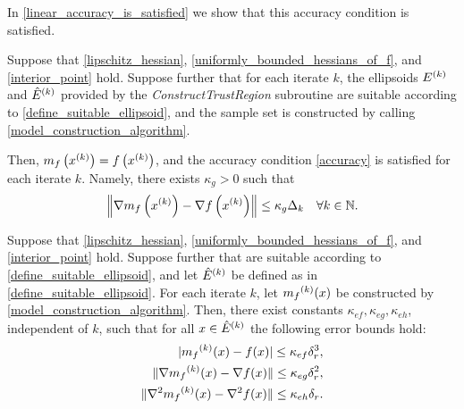 \documentclass{article}
\begin{document}
In \cref{linear_accuracy_is_satisfied} we show that this accuracy condition is satisfied.


\begin{theorem}
\label{linear_accuracy_is_satisfied}

Suppose that \cref{lipschitz_hessian}, \cref{uniformly_bounded_hessians_of_f}, and \cref{interior_point} hold.
Suppose further that for each iterate $k$, the ellipsoids ${E^{(k)}}$ and ${{\hat E}^{(k)}}$ provided by the \emph{ConstructTrustRegion} subroutine 
are suitable according to \cref{define_suitable_ellipsoid},
and the sample set is constructed by calling \cref{model_construction_algorithm}.


Then, $m_f\left(x^{(k)}\right) = f\left(x^{(k)}\right)$, and
the accuracy condition \cref{accuracy} is satisfied for each iterate $k$.
Namely, there exists $\kappa_{g} > 0$ such that 
\begin{align*}
\left\|\nabla m_f\left(x^{(k)}\right) - \nabla f\left(x^{(k)}\right)\right\| \le \kappa_g \Delta_k \quad \forall k \in \mathbb N.
\end{align*}
\end{theorem}


\begin{theorem}
\label{linear_accuracy_is_satisfied}

Suppose that \cref{lipschitz_hessian}, \cref{uniformly_bounded_hessians_of_f}, and \cref{interior_point} hold.  
Suppose further that 
are suitable according to \cref{define_suitable_ellipsoid}, and let ${{\hat E}^{(k)}}$ be defined as in \cref{define_suitable_ellipsoid}.    For each iterate $k$, let ${{m}_f}^{(k)}(x)$ be constructed by \cref{model_construction_algorithm}.    
Then,  there exist constants $\kappa_{ef}, \kappa_{eg}, \kappa_{eh}$, independent of $k$,  such that for all $x \in {{\hat E}^{(k)}}$ the following error bounds hold:
 \begin{align*}
|{{m}_f}^{(k)}(x) - f(x)| \le \kappa_{ef} \delta_r^3, \\
\|\nabla {{m}_f}^{(k)}(x) - \nabla  f(x)\| \le \kappa_{eg}\delta_r^2,  \\
\|\nabla^2 {{m}_f}^{(k)}(x) - \nabla^2  f(x)\| \le \kappa_{eh}\delta_r. 
\end{align*}


\end{theorem}
\end{document}
